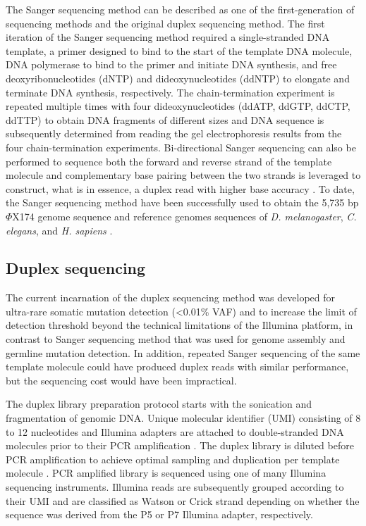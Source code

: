 The Sanger sequencing method can be described as one of the first-generation of sequencing methods and the original duplex sequencing method. The first iteration of the Sanger sequencing method required a single-stranded DNA template, a primer designed to bind to the start of the template DNA molecule, DNA polymerase to bind to the primer and initiate DNA synthesis, and free deoxyribonucleotides (dNTP) and dideoxynucleotides (ddNTP) to elongate and terminate DNA synthesis, respectively. The chain-termination experiment is repeated multiple times with four dideoxynucleotides (ddATP, ddGTP, ddCTP, ddTTP) to obtain DNA fragments of different sizes and DNA sequence is subsequently determined from reading the gel electrophoresis results from the four chain-termination experiments. Bi-directional Sanger sequencing can also be performed to sequence both the forward and reverse strand of the template molecule and complementary base pairing between the two strands is leveraged to construct, what is in essence, a duplex read with higher base accuracy \cite{Sanger1977-os}. To date, the Sanger sequencing method have been successfully used to obtain the 5,735 bp $\Phi$X174 genome sequence \cite{Sanger1977-os} and reference genomes sequences of \textit{D. melanogaster}, \textit{C. elegans}, and \textit{H. sapiens} \cite{}.

\subsection{Duplex sequencing}

The current incarnation of the duplex sequencing method was developed for ultra-rare somatic mutation detection (<0.01\% VAF) and to increase the limit of detection threshold beyond the technical limitations of the Illumina platform, in contrast to Sanger sequencing method that was used for genome assembly and germline mutation detection.  In addition, repeated Sanger sequencing of the same template molecule could have produced duplex reads with similar performance, but the sequencing cost would have been impractical. 

The duplex library preparation protocol starts with the sonication and fragmentation of genomic DNA. Unique molecular identifier (UMI) consisting of 8 to 12 nucleotides and Illumina adapters are attached to double-stranded DNA molecules prior to their PCR amplification \cite{Schmitt2012-yr}. The duplex library is diluted before PCR amplification to achieve optimal sampling and duplication per template molecule \cite{Hoang2016-jx, Abascal2021-pk}. PCR amplified library is sequenced using one of many Illumina sequencing instruments. Illumina reads are subsequently grouped according to their UMI and are classified as Watson or Crick strand depending on whether the sequence was derived from the P5 or P7 Illumina adapter, respectively. 

